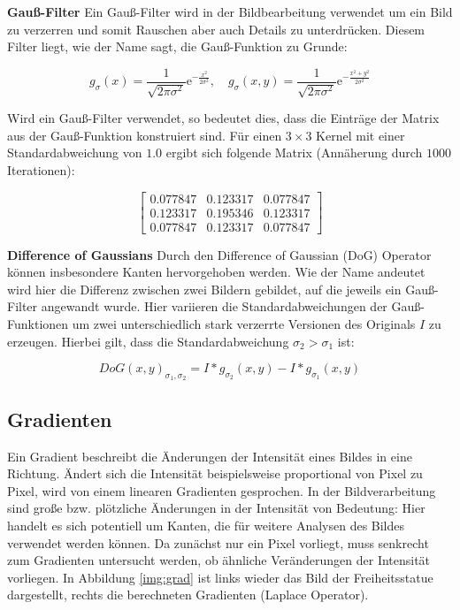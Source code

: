 \textbf{Gauß-Filter}
Ein Gauß-Filter wird in der Bildbearbeitung verwendet um ein Bild zu verzerren und somit Rauschen aber auch Details zu unterdrücken. Diesem Filter liegt, wie der Name sagt, die Gauß-Funktion zu Grunde:

$$
g_{\sigma}(x)=\frac{1}{\sqrt{2\pi\sigma^{2}}}\mathrm{e}^{-\frac{x^{2}}{2\sigma^{2}}}, \quad g_{\sigma}(x, y) = \frac{1}{\sqrt{2\pi\sigma^{2}}}\mathrm{e}^{-\frac{x^{2} + y^{2}}{2\sigma^{2}}}
$$

Wird ein Gauß-Filter verwendet, so bedeutet dies, dass die Einträge der Matrix aus der Gauß-Funktion konstruiert sind. Für einen $3 \times 3$ Kernel mit einer Standardabweichung von $1.0$ ergibt sich folgende Matrix (Annäherung durch $1000$ Iterationen):

$$
\begin{bmatrix}
0.077847	& 0.123317	& 0.077847	\\
0.123317	& 0.195346	& 0.123317	\\
0.077847	& 0.123317	& 0.077847
\end{bmatrix}
$$ 

\textbf{Difference of Gaussians}
Durch den Difference of Gaussian (DoG) Operator können insbesondere Kanten hervorgehoben werden. Wie der Name andeutet wird hier die Differenz zwischen zwei Bildern gebildet, auf die jeweils ein Gauß-Filter angewandt wurde. Hier variieren die Standardabweichungen der Gauß-Funktionen um zwei unterschiedlich stark verzerrte Versionen des Originals $I$ zu erzeugen. Hierbei gilt, dass die Standardabweichung $\sigma_{2} > \sigma_{1}$ ist:

$$ DoG(x, y)_{\sigma_{1}, \sigma_{2}} = I * g_{\sigma_2}(x, y) - I * g_{\sigma_1}(x, y)$$

\subsection{Gradienten}

Ein Gradient beschreibt die Änderungen der Intensität eines Bildes in eine Richtung.  Ändert sich die Intensität beispielsweise proportional von Pixel zu Pixel, wird von einem linearen Gradienten gesprochen. In der Bildverarbeitung sind große bzw. plötzliche Änderungen in der Intensität von Bedeutung: Hier handelt es sich potentiell um Kanten, die für weitere Analysen des Bildes verwendet werden können. Da zunächst nur ein Pixel vorliegt, muss senkrecht zum Gradienten untersucht werden, ob ähnliche Veränderungen der Intensität vorliegen. In Abbildung \ref{img:grad} ist links wieder das Bild der Freiheitsstatue dargestellt, rechts die berechneten Gradienten (Laplace Operator).

